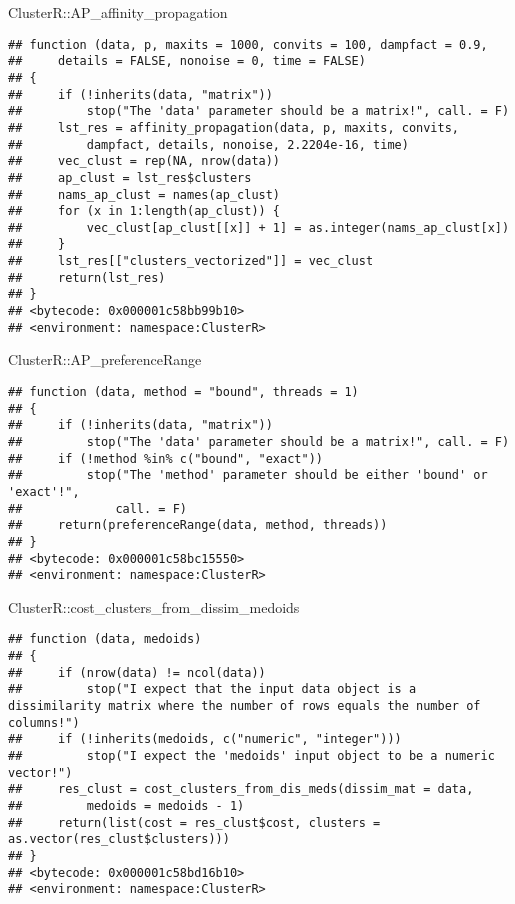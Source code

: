 \documentclass[
]{article}
\newenvironment{Shaded}{\begin{snugshade}}{\end{snugshade}}
\newcommand{\NormalTok}[1]{#1}
\newcommand{\SpecialCharTok}[1]{\textcolor[rgb]{0.00,0.00,0.00}{#1}}
\begin{document}
\begin{Shaded}
\begin{Highlighting}[]
\NormalTok{ClusterR}\SpecialCharTok{::}\NormalTok{AP\_affinity\_propagation}
\end{Highlighting}
\end{Shaded}

\begin{verbatim}
## function (data, p, maxits = 1000, convits = 100, dampfact = 0.9, 
##     details = FALSE, nonoise = 0, time = FALSE) 
## {
##     if (!inherits(data, "matrix")) 
##         stop("The 'data' parameter should be a matrix!", call. = F)
##     lst_res = affinity_propagation(data, p, maxits, convits, 
##         dampfact, details, nonoise, 2.2204e-16, time)
##     vec_clust = rep(NA, nrow(data))
##     ap_clust = lst_res$clusters
##     nams_ap_clust = names(ap_clust)
##     for (x in 1:length(ap_clust)) {
##         vec_clust[ap_clust[[x]] + 1] = as.integer(nams_ap_clust[x])
##     }
##     lst_res[["clusters_vectorized"]] = vec_clust
##     return(lst_res)
## }
## <bytecode: 0x000001c58bb99b10>
## <environment: namespace:ClusterR>
\end{verbatim}

\begin{Shaded}
\begin{Highlighting}[]
\NormalTok{ClusterR}\SpecialCharTok{::}\NormalTok{AP\_preferenceRange}
\end{Highlighting}
\end{Shaded}

\begin{verbatim}
## function (data, method = "bound", threads = 1) 
## {
##     if (!inherits(data, "matrix")) 
##         stop("The 'data' parameter should be a matrix!", call. = F)
##     if (!method %in% c("bound", "exact")) 
##         stop("The 'method' parameter should be either 'bound' or 'exact'!", 
##             call. = F)
##     return(preferenceRange(data, method, threads))
## }
## <bytecode: 0x000001c58bc15550>
## <environment: namespace:ClusterR>
\end{verbatim}

\begin{Shaded}
\begin{Highlighting}[]
\NormalTok{ClusterR}\SpecialCharTok{::}\NormalTok{cost\_clusters\_from\_dissim\_medoids}
\end{Highlighting}
\end{Shaded}

\begin{verbatim}
## function (data, medoids) 
## {
##     if (nrow(data) != ncol(data)) 
##         stop("I expect that the input data object is a dissimilarity matrix where the number of rows equals the number of columns!")
##     if (!inherits(medoids, c("numeric", "integer"))) 
##         stop("I expect the 'medoids' input object to be a numeric vector!")
##     res_clust = cost_clusters_from_dis_meds(dissim_mat = data, 
##         medoids = medoids - 1)
##     return(list(cost = res_clust$cost, clusters = as.vector(res_clust$clusters)))
## }
## <bytecode: 0x000001c58bd16b10>
## <environment: namespace:ClusterR>
\end{verbatim}
\end{document}
